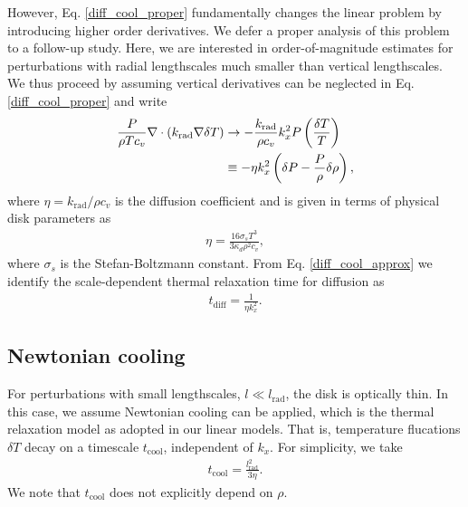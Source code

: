 However, Eq. \ref{diff_cool_proper} fundamentally changes the linear
problem by introducing higher order derivatives. We defer a proper
analysis of this problem to a follow-up study. Here, we are interested
in order-of-magnitude estimates for perturbations with radial
lengthscales much smaller than vertical lengthscales. We thus proceed 
by assuming vertical derivatives can be neglected in 
Eq. \ref{diff_cool_proper} and write  
\begin{align}\label{diff_cool_approx}
  \frac{P}{\rho T c_v} \nabla\cdot\left(k_\mathrm{rad}\nabla\delta
    T\right) &\to -\frac{k_\mathrm{rad}}{\rho
    c_v}k_x^2P\left(\frac{\delta T}{T}\right)\notag\\
  &\equiv -\eta k_x^2 \left(\delta P - \frac{P}{\rho}\delta\rho\right), 
\end{align}
where $\eta=k_\mathrm{rad}/\rho c_v$ is the diffusion coefficient and
is given in terms of physical disk parameters as 
\begin{align}\label{eta_def}
  \eta = \frac{16\sigma_s T^3}{3\kappa_d\rho^2 c_v}, 
\end{align}
where $\sigma_s$ is the Stefan-Boltzmann constant. 
From Eq. \ref{diff_cool_approx} we identify the scale-dependent thermal relaxation
time for diffusion as 
\begin{align}\label{tc_diff_cool} 
  t_\mathrm{diff} = \frac{1}{\eta k_x^2}.%
\end{align}


\subsection{Newtonian cooling}\label{newton_cool}
For perturbations with small lengthscales, $l\ll l_\mathrm{rad}$, 
the disk is optically thin. In this case, we assume 
Newtonian cooling can be applied, which is the thermal
relaxation model as adopted in our linear models. That is, temperature
flucations $\delta T$ decay on a timescale $t_\mathrm{cool}$,
independent of $k_x$. For simplicity, we take  
\begin{align}
  t_\mathrm{cool} = \frac{l_\mathrm{rad}^2}{3\eta}. 
\end{align}
We note that $t_\mathrm{cool}$ does not explicitly depend on $\rho$. 

